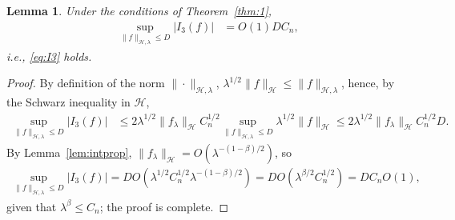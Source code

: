 \documentclass[11pt]{article}
\newtheorem{lemma}{Lemma}
\theoremstyle{definition}
\theoremstyle{remark}
\begin{document}
\begin{lemma}
\label{lem:I3}
Under the conditions of Theorem~\ref{thm:1},
\begin{align*}
\sup_{\|f\|_{\mathcal{H},\lambda} \leq D} |I_3(f)| & = O(1) D C_n,
\end{align*}
i.e., \eqref{eq:I3} holds.
\end{lemma}
\begin{proof}
By definition of the norm $\|\cdot\|_{\mathcal{H},\lambda}$, $\lambda^{1/2} \|f\|_{\mathcal{H}} \leq \|f\|_{\mathcal{H},\lambda}$, hence, by the Schwarz inequality in $\mathcal{H}$,
\begin{align*}
\sup_{ \|f\|_{\mathcal{H},\lambda} \leq D} |I_3(f)| & \leq 2 \lambda^{1/2} \|f_{\lambda}\|_{\mathcal{H}} C_n^{1/2} \sup_{ \|f\|_{\mathcal{H},\lambda} \leq D} \lambda^{1/2} \|f\|_{\mathcal{H}} \leq 2 \lambda^{1/2} \|f_\lambda\|_{\mathcal{H}} C_n^{1/2} D.
\end{align*}
By Lemma~\ref{lem:intprop}, $\|f_{\lambda}\|_{\mathcal{H}} =O(\lambda^{-(1-\beta)/2})$, so
\begin{align*}
\sup_{ \|f\|_{\mathcal{H},\lambda} \leq D} |I_3(f)| = D O( \lambda^{1/2} C_n^{1/2} \lambda^{-(1-\beta)/2}) = D O( \lambda^{\beta/2} C_n^{1/2}) = D C_n O(1),
\end{align*}
given that $\lambda^{\beta} \leq C_n$; the proof is complete.
\end{proof}
\end{document}
